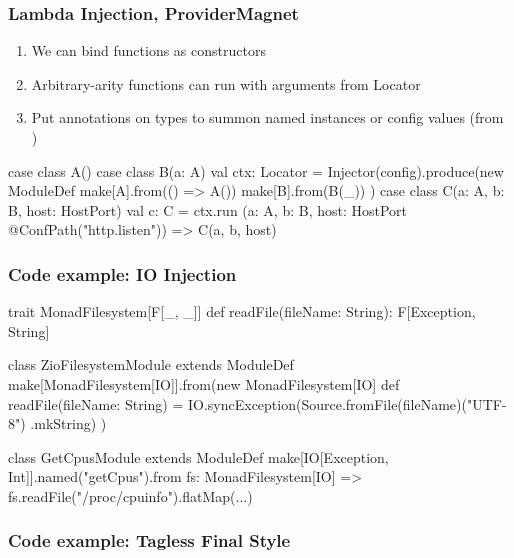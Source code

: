 \documentclass[usenames,dvipsnames]{beamer}
\begin{document}
\begin{frame}[fragile]
\frametitle{Lambda Injection, ProviderMagnet}
\begin{enumerate}
\item We can bind functions as constructors
\item Arbitrary-arity functions can run with arguments from Locator
\item Put annotations on types to summon named instances or config values (from )
\end{enumerate}
\begin{scalacode}
case class A()
case class B(a: A)
val ctx: Locator = Injector(config).produce(new ModuleDef { 
  make[A].from(() => A())
  make[B].from(B(_))
})
case class C(a: A, b: B, host: HostPort)
val c: C = ctx.run {
  (a: A, b: B, host: HostPort @ConfPath("http.listen")) =>
    C(a, b, host)
}
\end{scalacode}
\end{frame}

\begin{frame}[fragile]
\frametitle{Code example: IO Injection}
\begin{enumerate}
\begin{scalacode}
trait MonadFilesystem[F[_, _]] {
  def readFile(fileName: String): F[Exception, String]
}

class ZioFilesystemModule extends ModuleDef {
  make[MonadFilesystem[IO]].from(new MonadFilesystem[IO] {
    def readFile(fileName: String) = 
      IO.syncException(Source.fromFile(fileName)("UTF-8")
        .mkString) 
  })
}

class GetCpusModule extends ModuleDef {
  make[IO[Exception, Int]].named("getCpus").from {
    fs: MonadFilesystem[IO] =>
      fs.readFile("/proc/cpuinfo").flatMap(...)
  }
}
\end{scalacode}
\end{enumerate}
\end{frame}

\begin{frame}[fragile]
\frametitle{Code example: Tagless Final Style}
\begin{enumerate}


\end{enumerate}
\end{frame}
\end{document}
